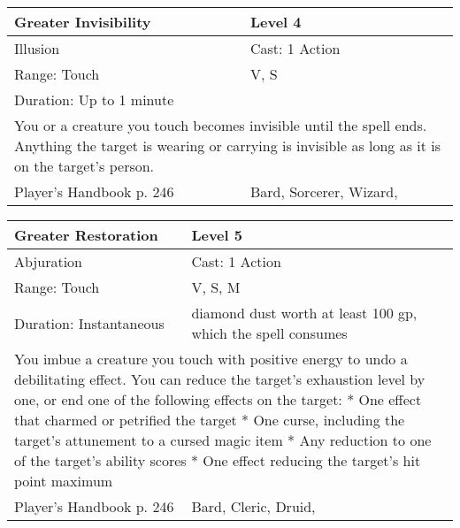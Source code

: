 \documentclass[11pt]{report}
\begin{document}
\begin{table}[H]
	\begin{tabular}{||p{6cm}|p{6cm}||}
		\hline\hline
		\bf{Greater Invisibility} & Level 4\\ \hline
		Illusion & Cast: 1 Action\\ \hline
		Range: Touch & V, S\\ \hline
		Duration: Up to 1 minute & \\ \hline
		\multicolumn{2}{||p{12cm}||}{You or a creature you touch becomes invisible until the spell ends. Anything the target is wearing or carrying is invisible as long as it is on the target’s person.}\\ \hline
Player's Handbook p. 246 & Bard, Sorcerer, Wizard, \\ \hline\hline
	\end{tabular}
\end{table}

\begin{table}[H]
	\begin{tabular}{||p{6cm}|p{6cm}||}
		\hline\hline
		\bf{Greater Restoration} & Level 5\\ \hline
		Abjuration & Cast: 1 Action\\ \hline
		Range: Touch & V, S, M\\ \hline
		Duration: Instantaneous & diamond dust worth at least 100 gp, which the spell consumes\\ \hline
		\multicolumn{2}{||p{12cm}||}{You imbue a creature you touch with positive energy to undo a debilitating effect. You can reduce the target’s exhaustion level by one, or end one of the following effects on the target: 
* One effect that charmed or petrified the target 
* One curse, including the target’s attunement to a cursed magic item 
* Any reduction to one of the target’s ability scores 
* One effect reducing the target’s hit point maximum}\\ \hline
Player's Handbook p. 246 & Bard, Cleric, Druid, \\ \hline\hline
	\end{tabular}
\end{table}
\end{document}
